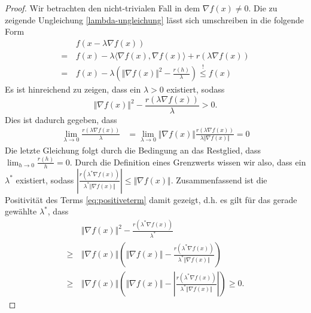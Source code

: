 \begin{proof}
Wir betrachten den nicht-trivialen Fall in dem $\nabla f(x) \neq 0$. 
Die zu zeigende Ungleichung \eqref{lambda-ungleichung} l\"asst sich umschreiben in die folgende Form
\begin{align*}
&f(x - \lambda \nabla f(x))\\
 = \, &f(x) - \lambda \langle \nabla f(x), \nabla f(x)\rangle + r(\lambda \nabla f(x)) \\
= \, &f(x) - \lambda( \Vert\nabla f(x)\Vert^2 - \frac{r(h)}{\lambda}) \overset{!}{\leq} f(x)
\end{align*}
Es ist hinreichend zu zeigen, dass ein $\lambda>0$ existiert, sodass
\begin{equation}
\label{eq:positiveterm}
\Vert\nabla f(x)\Vert^2 - \frac{r(\lambda \nabla f(x))}{\lambda} >0.
\end{equation}
  Dies ist dadurch gegeben, dass 
\begin{align*}
\lim_{\lambda\to 0} \frac{r(\lambda \nabla f(x))}{\lambda} &= \lim_{\lambda \to 0}\Vert\nabla f(x)\Vert \frac{r(\lambda \nabla f(x))}{\lambda \Vert\nabla f(x)\Vert}= 0
\end{align*}
Die letzte Gleichung folgt durch die Bedingung an das Restglied, dass $\lim_{h\to 0}\frac{r(h)}{h} = 0$. Durch die Definition eines Grenzwerts wissen wir also, dass ein $\lambda^*$ existiert, sodass $\left| \frac{r(\lambda^* \nabla f(x))}{\lambda^* \Vert\nabla f(x)\Vert} \right| \leq \Vert\nabla f(x)\Vert$. Zusammenfassend ist die Positivit\"at des Terms \eqref{eq:positiveterm} damit gezeigt, d.h. es gilt f\"ur das gerade gew\"ahlte $\lambda^*$, dass
\begin{align*}
&\Vert\nabla f(x)\Vert^2 - \frac{r(\lambda^* \nabla f(x))}{\lambda^*} \\
\geq \, &\Vert\nabla f(x)\Vert \left( \Vert \nabla f(x)\Vert - \frac{r (\lambda^* \nabla f(x))}{\lambda^* \Vert \nabla f(x)\Vert} \right) \\
\geq \, &\Vert \nabla f(x)\Vert \left(\Vert\nabla f(x)\Vert - \left| \frac{r (\lambda^* \nabla f(x))}{\lambda^* \Vert \nabla f(x)\Vert}\right| \right) \geq 0. 
\end{align*}
\end{proof}




